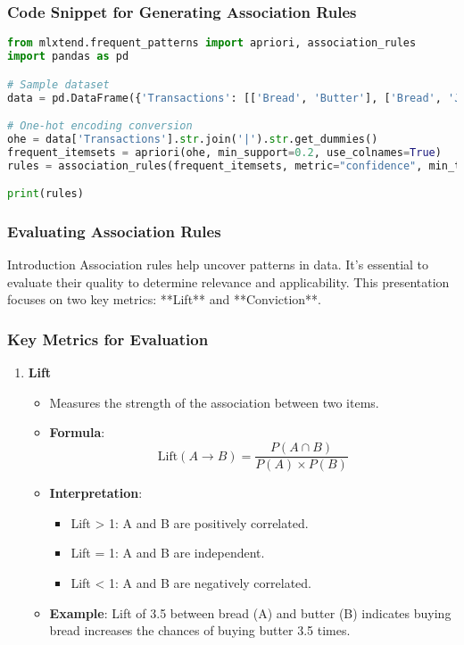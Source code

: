 \documentclass[aspectratio=169]{beamer}
\begin{document}
\begin{frame}[fragile]
    \frametitle{Code Snippet for Generating Association Rules}
    \begin{lstlisting}[language=Python]
from mlxtend.frequent_patterns import apriori, association_rules
import pandas as pd

# Sample dataset
data = pd.DataFrame({'Transactions': [['Bread', 'Butter'], ['Bread', 'Jam'], ['Butter', 'Jam']]})

# One-hot encoding conversion
ohe = data['Transactions'].str.join('|').str.get_dummies()
frequent_itemsets = apriori(ohe, min_support=0.2, use_colnames=True)
rules = association_rules(frequent_itemsets, metric="confidence", min_threshold=0.5)

print(rules)
    \end{lstlisting}
\end{frame}

\begin{frame}[fragile]
    \frametitle{Evaluating Association Rules}
    \begin{block}{Introduction}
        Association rules help uncover patterns in data. It's essential to evaluate their quality to determine relevance and applicability. This presentation focuses on two key metrics: **Lift** and **Conviction**.
    \end{block}
\end{frame}

\begin{frame}[fragile]
    \frametitle{Key Metrics for Evaluation}
    \begin{enumerate}
        \item \textbf{Lift}
        \begin{itemize}
            \item Measures the strength of the association between two items.
            \item \textbf{Formula}:
            \begin{equation}
                \text{Lift}(A \rightarrow B) = \frac{P(A \cap B)}{P(A) \times P(B)}
            \end{equation}
            \item \textbf{Interpretation}:
            \begin{itemize}
                \item Lift > 1: A and B are positively correlated.
                \item Lift = 1: A and B are independent.
                \item Lift < 1: A and B are negatively correlated.
            \end{itemize}
            \item \textbf{Example}: Lift of 3.5 between bread (A) and butter (B) indicates buying bread increases the chances of buying butter 3.5 times.
        \end{itemize}
    \end{enumerate}
\end{frame}
\end{document}
